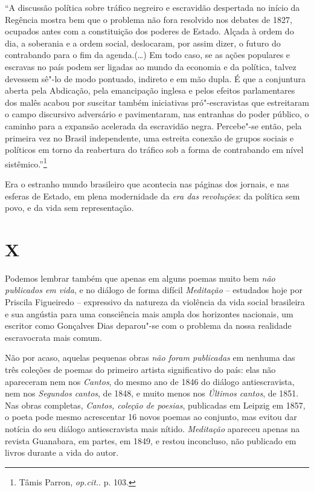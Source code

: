 ``A discussão política sobre tráfico negreiro e escravidão despertada no
início da Regência mostra bem que o problema não fora resolvido nos
debates de 1827, ocupados antes com a constituição dos poderes de
Estado. Alçada à ordem do dia, a soberania e a ordem social, deslocaram,
por assim dizer, o futuro do contrabando para o fim da agenda.(\ldots{}) Em
todo caso, se as ações populares e escravas no país podem ser ligadas ao
mundo da economia e da política, talvez devessem sê"-lo de modo pontuado,
indireto e em mão dupla. É que a conjuntura aberta pela Abdicação, pela
emancipação inglesa e pelos efeitos parlamentares dos malês acabou por
suscitar também iniciativas pró"-escravistas que estreitaram o campo
discursivo adversário e pavimentaram, nas entranhas do poder público, o
caminho para a expansão acelerada da escravidão negra. Percebe"-se então,
pela primeira vez no Brasil independente, uma estreita conexão de grupos
sociais e políticos em torno da reabertura do tráfico sob a forma de
contrabando em nível sistêmico.''\footnote{Tâmis Parron, \emph{op.cit.}.
  p. 103.}

Era o estranho mundo brasileiro que acontecia nas páginas dos jornais, e
nas esferas de Estado, em plena modernidade da \emph{era das
revoluções}: da política sem povo, e da vida sem representação.

\section{X}

Podemos lembrar também que apenas em alguns poemas muito bem \emph{não
publicados em vida}, e no diálogo de forma difícil \emph{Meditação} --
estudados hoje por Priscila Figueiredo -- expressivo da natureza da
violência da vida social brasileira e sua angústia para uma consciência
mais ampla dos horizontes nacionais, um escritor como Gonçalves Dias
deparou"-se com o problema da nossa realidade escravocrata mais comum.

Não por acaso, aquelas pequenas obras \emph{não foram publicadas} em
nenhuma das três coleções de poemas do primeiro artista significativo do
país: elas não apareceram nem nos \emph{Cantos}, do mesmo ano de 1846 do
diálogo antiescravista, nem nos \emph{Segundos cantos}, de 1848, e muito
menos nos \emph{Últimos cantos}, de 1851. Nas obras completas,
\emph{Cantos, coleção de poesias}, publicadas em Leipzig em 1857, o
poeta pode mesmo acrescentar 16 novos poemas ao conjunto, mas evitou dar
notícia do seu diálogo antiescravista mais nítido. \emph{Meditação}
apareceu apenas na revista Guanabara, em partes, em 1849, e restou
inconcluso, não publicado em livros durante a vida do autor.

